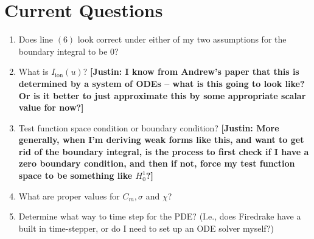 \documentclass[format=acmsmall,screen,timestamp=false,a4paper]{acmart}
\newcommand\justin[1]{\textbf{\textcolor[rgb]{1,0,0.5}{[Justin: #1]}}}
\begin{document}
\section{Current Questions}

\begin{enumerate}
    \item Does line $(6)$ look correct under either of my two assumptions for the boundary integral to be 0?
    \item What is $I_{\text{ion}}(u)$? \justin{I know from Andrew's paper that this is determined by a system of ODEs -- what is this going to look like?  Or is it better to just approximate this by some appropriate scalar value for now?}
    \item Test function space condition or boundary condition?  \justin{More generally, when I'm deriving weak forms like this, and want to get rid of the boundary integral, is the process to first check if I have a zero boundary condition, and then if not, force my test function space to be something like $H^1_0$?}
    \item What are proper values for $C_m, \sigma$ and $\chi$?
    \item Determine what way to time step for the PDE?  (I.e., does Firedrake have a built in time-stepper, or do I need to set up an ODE solver myself?)
\end{enumerate}
\end{document}
